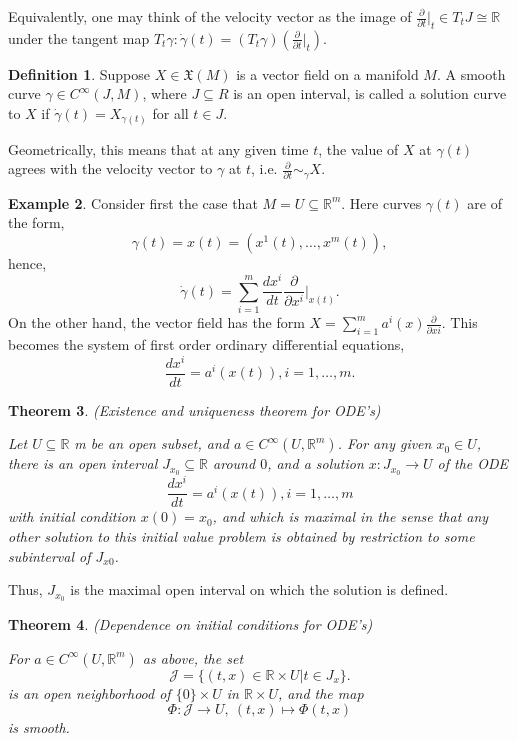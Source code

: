 \documentclass{article}
\newtheorem{theorem}{Theorem}[section]
\theoremstyle{definition}
\newtheorem{defn}[theorem]{Definition}
\newtheorem{example}[theorem]{Example}
\newenvironment{definition}
  {\vspace{8pt}\begin{mdframed}[backgroundcolor=blueish]\begin{defn}}
  {\end{defn}\end{mdframed}\vspace{4pt}}
\begin{document}
Equivalently, one may think of the velocity vector as the image of $\frac{\partial}{\partial t} |_{t} \in T_tJ \cong \mathbb R$ under the tangent map $T_t \gamma : \dot{\gamma}(t) = (T_t\gamma)( \frac{\partial}{\partial t}|_t)$.

\begin{definition}

Suppose $X \in \mathfrak X(M)$ is a vector field on a manifold $M$. A smooth curve $\gamma \in C^\infty(J, M)$, where $J \subseteq R$ is an open interval, is called a solution curve to $X$ if $\dot{\gamma}(t) = X_{\gamma(t)}$ for all $t \in J$.

\end{definition}


Geometrically, this means that at any given time $t$, the value of $X$ at $\gamma(t)$ agrees with the velocity vector to $\gamma$ at $t$, i.e. $\frac{\partial}{\partial t} \sim_\gamma X$.

\begin{example}
Consider first the case that $M = U \subseteq \mathbb R^m$. Here curves $\gamma (t)$ are of the form,
\[
    \gamma(t) = x(t) = (x^1 (t),\dots, x^m (t)),
\]
hence,
\[
    \dot{\gamma}(t) = \sum_{i=1}^m \frac{dx^i}{dt} \frac{\partial}{\partial x^i} \Bigr |_{x(t)}.
\]
On the other hand, the vector field has the form $X = \sum_{i=1}^m a^i (x) \frac{\partial}{\partial x i}$. This becomes the system of first order ordinary differential equations, 
\[
    \frac{dx^i}{dt} = a^i (x(t)), i = 1,\dots, m.
\]
\end{example}

\begin{theorem} (Existence and uniqueness theorem for ODE's)

Let $U \subseteq \mathbb R$ m be an open subset, and $a \in C^\infty(U, \mathbb R^m)$. For any given $x_0 \in U$, there is an open interval $J_{x_0} \subseteq \mathbb R$ around $0$, and a solution $x : J_{x_0} \rightarrow U$ of the ODE
\[
    \frac{d x^i}{dt} = a^i (x(t)), i = 1, \dots, m
\]
with initial condition $x(0) = x_0$, and which is maximal in the sense that any other solution to this initial value problem is obtained by restriction to some subinterval of $J_{x0}$.

\end{theorem}

Thus, $J_{x_0}$ is the maximal open interval on which the solution is defined.

\begin{theorem}  (Dependence on initial conditions for ODE's)

For $a \in C^\infty(U,\mathbb R^m)$ as above, the set 
\[ 
    \mathscr J = \{(t, x) \in \mathbb R \times U | t \in J_x \}.
\]
is an open neighborhood of $\{0\} \times U$ in $\mathbb R \times U$, and the map 
\[
    \Phi : \mathscr  J \rightarrow U, \  (t, x) \mapsto \Phi(t, x)
\]
is smooth.

\end{theorem}
\end{document}

